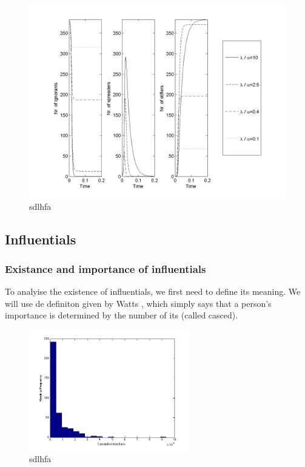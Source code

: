 \begin{figure}[H!]
\includegraphics[width=14cm]{SIR_ODE}
\caption{sdlhfa}
\label{SIR_ODE}
\end{figure}
\clearpage
\subsection{Influentials}


\subsubsection{Existance and importance of influentials}


To analyise the existence of influentials, we first need to define its meaning. We will use de definiton given by Watts \cite{influentials}, which simply says that a person's importance is determined by the number of its  (called casced).

\begin{figure}[H!]
\includegraphics[width=7cm]{influ2}
\caption{sdlhfa}
\label{Histo}
\end{figure}

